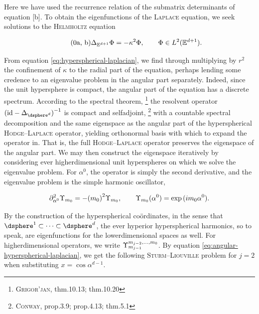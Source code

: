 \noindent
Here we have used the recurrence relation of the submatrix determinants of equation \subeqref{\ref{eq:hyperspherical-metric-recurrence}}[b].
To obtain the eigenfunctions of the \textsc{Laplace} equation, we seek solutions to the \textsc{Helmholtz} equation

\begin{subequations}\label{eq:Helmholtz-equation}
  \begin{equation}\tag{\theequation{a, b}}
    \Delta_{\euclidean^{d+1}}\Phi = -\kappa^2 \Phi, \qquad \Phi \in L^2(\euclidean^{d+1}).
  \end{equation}
\end{subequations}

\noindent
From equation \eqref{eq:hyperspherical-laplacian}, we find through multiplying by $r^2$ the confinement of $\kappa$ to the radial part of the equation, perhaps lending some credence to an eigenvalue problem in the angular part separately.
Indeed, since the unit hypersphere is compact, the angular part of the equation has a discrete spectrum.
According to the spectral theorem,%
\footnote{%
  \cite{grigoryan2009heat} \textsc{Grigor'jan}, thm.10.13; thm.10.20
}
the resolvent operator ${(\mathrm{id} - \Delta_{\dsphere^d})}^{-1}$ is compact and selfadjoint,%
\footnote{%
  \cite{conway2007course} \textsc{Conway}, prop.3.9; prop.4.13; thm.5.1
}
with a countable spectral decomposition and the same eigenspace as the angular part of the hyperspherical \textsc{Hodge}--\textsc{Laplace} operator, yielding orthonormal basis with which to expand the operator in.
That is, the full \textsc{Hodge}--\textsc{Laplace} operator preserves the eigenspace of the angular part.
We may then construct the eigenspace iteratively by considering ever higherdimensional unit hyperspheres on which we solve the eigenvalue problem.
For $\alpha^0$, the operator is simply the second derivative, and the eigenvalue problem is the simple harmonic oscillator,

\begin{equation}
  \partial_{\alpha^0}^2 \Upsilon_{m_0} = - {(m_{0})}^2 \Upsilon_{m_0}, \qquad \Upsilon_{m_0}(\alpha^0) = \exp{(i m_{0} \alpha^0)}.
\end{equation}

\noindent
By the construction of the hyperspherical coördinates, in the sense that $\dsphere^1 \subset \dots \subset \dsphere^d$, the ever hyperior hyperspherical harmonics, so to speak, are eigenfunctions for the lowerdimensional spaces as well.
For higherdimensional operators, we write $\Upsilon_{m_{j-1}}^{m_{j-2}, \dots, m_0}$.
By equation \eqref{eq:angular-hyperspherical-laplacian}, we get the following \textsc{Sturm}--\textsc{Liouville} problem for $j = 2$ when substituting $x = \cos{\alpha^{d-1}}$.

